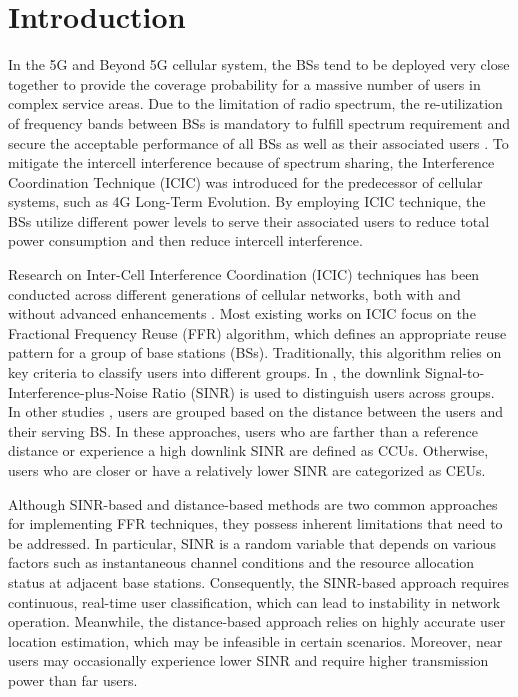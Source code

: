 \documentclass{svproc}
\begin{document}
\section{Introduction}
In the 5G and Beyond 5G cellular system, the BSs tend to be deployed very close together to provide the coverage probability for a massive number of users in complex service areas. Due to the limitation of radio spectrum, the re-utilization of frequency bands between BSs is mandatory to fulfill spectrum requirement and secure the acceptable performance of all BSs as well as their associated users \cite{6Gsurveydensi,ICIC6G}. To mitigate the intercell interference because of spectrum sharing, the Interference Coordination Technique (ICIC) was introduced for the predecessor of cellular systems, such as 4G Long-Term Evolution. By employing ICIC technique, the BSs utilize different power levels to serve their associated users to reduce total power consumption and then reduce intercell interference. 

Research on Inter-Cell Interference Coordination (ICIC) techniques has been conducted across different generations of cellular networks, both with and without advanced enhancements \cite{ICIISAC,ICICAI}. Most existing works on ICIC focus on the Fractional Frequency Reuse (FFR) algorithm, which defines an appropriate reuse pattern for a group of base stations (BSs). Traditionally, this algorithm relies on key criteria to classify users into different groups. In \cite{FFRPhycom,6047548}, the downlink Signal-to-Interference-plus-Noise Ratio (SINR) is used to distinguish users across groups. In other studies \cite{distanceFFR,FFRdistance}, users are grouped based on the distance between the users and their serving BS. In these approaches, users who are farther than a reference distance or experience a high downlink SINR are defined as CCUs. Otherwise, users who are closer or have a relatively lower SINR are categorized as CEUs.

Although SINR-based and distance-based methods are two common approaches for implementing FFR techniques, they possess inherent limitations that need to be addressed. In particular, SINR is a random variable that depends on various factors such as instantaneous channel conditions and the resource allocation status at adjacent base stations. Consequently, the SINR-based approach requires continuous, real-time user classification, which can lead to instability in network operation. Meanwhile, the distance-based approach relies on highly accurate user location estimation, which may be infeasible in certain scenarios. Moreover, near users may occasionally experience lower SINR and require higher transmission power than far users. 
\end{document}
